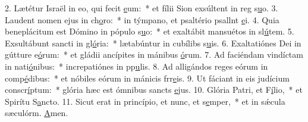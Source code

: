 2. Lætétur Israël in eo, qui fecit \uline{e}um:~* et fílii Sion exsúltent in reg s\uline{u}o.
3. Laudent nomen ejus in ch\uline{o}ro:~* in týmpano, et psaltério psallnt \uline{e}i.
4. Quia beneplácitum est Dómino in pópulo s\uline{u}o:~* et exaltábit mansuétos in sl\uline{ú}tem.
5. Exsultábunt sancti in gl\uline{ó}ria:~* lætabúntur in cubílibs s\uline{u}is.
6. Exaltatiónes Dei in gútture e\uline{ó}rum:~* et gládii ancípites in mánibus \uline{ó}rum.
7. Ad faciéndam vindíctam in nati\uline{ó}nibus:~* increpatiónes in pp\uline{u}lis.
8. Ad alligándos reges eórum in comp\uline{é}dibus:~* et nóbiles eórum in mánicis frr\uline{e}is.
9. Ut fáciant in eis judícium conscr\uline{í}ptum:~* glória hæc est ómnibus sancts \uline{e}jus.
10. Glória Patri, et F\uline{í}lio,~* et Spirítu S\uline{a}ncto.
11. Sicut erat in princípio, et nunc, et s\uline{e}mper,~* et in sǽcula sæculórm. \uline{A}men.
